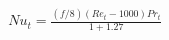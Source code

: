 \documentclass{report}
\begin{document}
\begin{multline}
	Nu_t=
	\frac{\left(f/8\right)\left(Re_t-1000\right)Pr_t}
	{1+1.27}\\
\end{multline}
\end{document}
